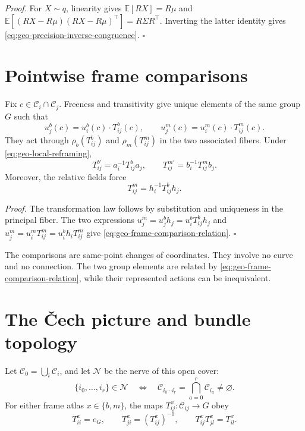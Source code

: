 \noindent\emph{Proof.}
For $X\sim q$, linearity gives $\mathbb E[RX]=R\mu$ and
$\mathbb E[(RX-R\mu)(RX-R\mu)^\top]=R\Sigma R^\top$.  Inverting the latter identity gives
\eqref{eq:geo-precision-inverse-congruence}. \hfill$\square$

\section{Pointwise frame comparisons}
\label{sec:geo-regime-one}

Fix $c\in\mathcal C_i\cap\mathcal C_j$.  Freeness and transitivity give unique elements of the
same group $G$ such that
\begin{equation}
u_j^b(c)=u_i^b(c)\cdot T_{ij}^b(c),
\qquad
u_j^m(c)=u_i^m(c)\cdot T_{ij}^m(c).
\label{eq:geo-frame-comparison}
\end{equation}
They act through $\rho_b(T_{ij}^b)$ and $\rho_m(T_{ij}^m)$ in the two associated fibers.  Under
\eqref{eq:geo-local-reframing},
\begin{equation}
T_{ij}^{b\prime}=a_i^{-1}T_{ij}^b a_j,
\qquad
T_{ij}^{m\prime}=b_i^{-1}T_{ij}^m b_j.
\label{eq:geo-regime-one-gauge-law}
\end{equation}
Moreover, the relative fields force
\begin{equation}
T_{ij}^m=h_i^{-1}T_{ij}^b h_j.
\label{eq:geo-frame-comparison-relation}
\end{equation}

\noindent\emph{Proof.}
The transformation law follows by substitution and uniqueness in the principal fiber.  The two
expressions
$u_j^m=u_j^b h_j=u_i^bT_{ij}^b h_j$ and
$u_j^m=u_i^mT_{ij}^m=u_i^b h_iT_{ij}^m$ give
\eqref{eq:geo-frame-comparison-relation}. \hfill$\square$

The comparisons are same-point changes of coordinates.  They involve no curve and no connection.
The two group elements are related by \eqref{eq:geo-frame-comparison-relation}, while their
represented actions can be inequivalent.

\section{The \v{C}ech picture and bundle topology}
\label{sec:geo-cech}

Let $\mathcal C_0=\bigcup_i\mathcal C_i$, and let $\mathcal N$ be the nerve of this open cover:
\begin{equation}
\{i_0,\ldots,i_r\}\in\mathcal N
\quad\Longleftrightarrow\quad
\mathcal C_{i_0\cdots i_r}=\bigcap_{a=0}^r\mathcal C_{i_a}\neq\varnothing.
\label{eq:geo-nerve}
\end{equation}
For either frame atlas $x\in\{b,m\}$, the maps $T_{ij}^x:\mathcal C_{ij}\to G$ obey
\begin{equation}
T_{ii}^x=e_G,
\qquad
T_{ji}^x=(T_{ij}^x)^{-1},
\qquad
T_{ij}^xT_{jl}^x=T_{il}^x.
\label{eq:geo-cech-cocycle}
\end{equation}

